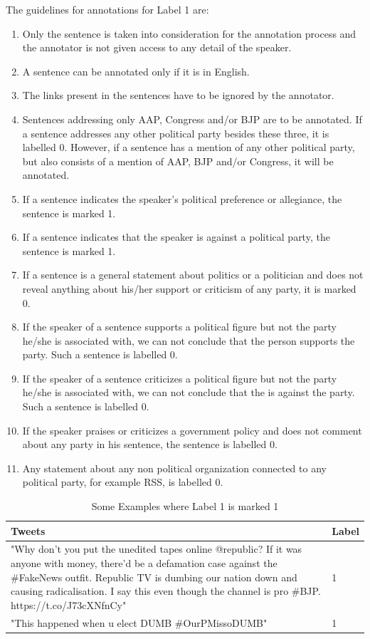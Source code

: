 \documentclass[a4paper,11pt]{article}
\begin{document}
The guidelines for annotations for Label 1 are:
\begin{enumerate}
    \item Only the sentence is taken into consideration for the annotation process and the annotator is not given access to any detail of the speaker.
    \item A sentence can be annotated only if it is in English.
    \item The links present in the sentences have to be ignored by the annotator.
    \item Sentences addressing only AAP, Congress and/or BJP are to be annotated. If a sentence addresses any other political party besides these three, it is labelled 0. However, if a sentence has a mention of any other political party, but also consists of a mention of AAP, BJP and/or Congress, it will be annotated.
    \item If a sentence indicates the speaker's political preference or allegiance, the sentence is marked 1.
    \item If a sentence indicates that the speaker is against a political party, the sentence is marked 1.
    \item If a sentence is a general statement about politics or a politician and does not reveal anything about his/her support or criticism of any party, it is marked 0.
    \item If the speaker of a sentence supports a political figure but not the party he/she is associated with, we can not conclude that the person supports the party. Such a sentence is labelled 0.
    \item If the speaker of a sentence criticizes a political figure but not the party he/she is associated with, we can not conclude that the is against the party. Such a sentence is labelled 0.
    \item If the speaker praises or criticizes a government policy and does not comment about any party in his sentence, the sentence is labelled 0.
    \item Any statement about any non political organization connected to any political party, for example RSS, is labelled 0.
\end{enumerate}

\begin{table}[!htbp]

\caption{Some Examples where Label 1 is marked 1}
\centering
\begin{tabular}{|p{12.25cm}|p{1cm}|} 
\hline
 Tweets & Label \\
 \hline \hline
 "Why don’t you put the unedited tapes online @republic? If it was anyone with money, there’d be a defamation case against the \#FakeNews outfit. Republic TV is dumbing our nation down and causing radicalisation. I say this even though the channel is pro \#BJP. https://t.co/J73cXNfnCy" & 1 \\ 
 \hline
 "This happened when u elect DUMB \#OurPMissoDUMB" & 1 \\  
\hline
\end{tabular}
\label{tab:lab1}
\end{table}
\end{document}
